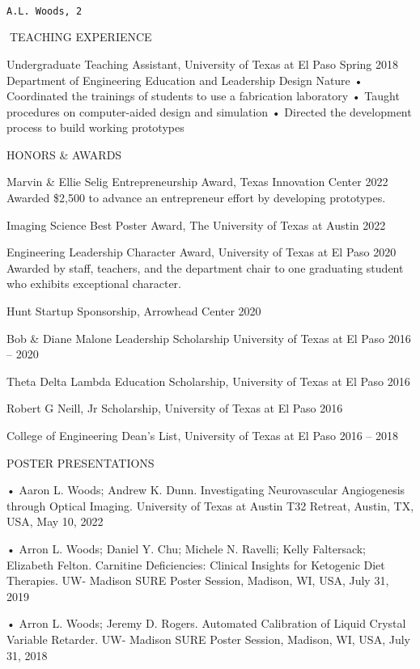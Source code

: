 \documentclass[
]{article}
\begin{document}
\begin{verbatim}
                                                                                   A.L. Woods, 2
\end{verbatim}

TEACHING EXPERIENCE

Undergraduate Teaching Assistant, University of Texas at El Paso Spring
2018 Department of Engineering Education and Leadership \textbar{}
Design Nature • Coordinated the trainings of students to use a
fabrication laboratory • Taught procedures on computer-aided design and
simulation • Directed the development process to build working
prototypes

HONORS \& AWARDS

Marvin \& Ellie Selig Entrepreneurship Award, Texas Innovation Center
2022 Awarded \$2,500 to advance an entrepreneur effort by developing
prototypes.

Imaging Science Best Poster Award, The University of Texas at Austin
2022

Engineering Leadership Character Award, University of Texas at El Paso
2020 Awarded by staff, teachers, and the department chair to one
graduating student who exhibits exceptional character.

Hunt Startup Sponsorship, Arrowhead Center 2020

Bob \& Diane Malone Leadership Scholarship University of Texas at El
Paso 2016 -- 2020

Theta Delta Lambda Education Scholarship, University of Texas at El Paso
2016

Robert G Neill, Jr Scholarship, University of Texas at El Paso 2016

College of Engineering Dean's List, University of Texas at El Paso 2016
-- 2018

POSTER PRESENTATIONS

• Aaron L. Woods; Andrew K. Dunn. Investigating Neurovascular
Angiogenesis through Optical Imaging. University of Texas at Austin T32
Retreat, Austin, TX, USA, May 10, 2022

• Arron L. Woods; Daniel Y. Chu; Michele N. Ravelli; Kelly Faltersack;
Elizabeth Felton. Carnitine Deficiencies: Clinical Insights for
Ketogenic Diet Therapies. UW- Madison SURE Poster Session, Madison, WI,
USA, July 31, 2019

• Arron L. Woods; Jeremy D. Rogers. Automated Calibration of Liquid
Crystal Variable Retarder. UW- Madison SURE Poster Session, Madison, WI,
USA, July 31, 2018
\end{document}
